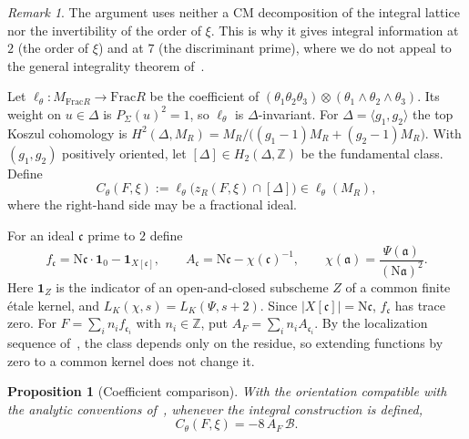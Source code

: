 \documentclass[11pt]{amsart}
\newtheorem{proposition}[theorem]{Proposition}
\theoremstyle{remark}
\newtheorem{remark}[theorem]{Remark}
\theoremstyle{definition}
\newcommand{\Z}{\mathbb{Z}}
\newcommand{\Nm}{\mathrm{N}}
\newcommand{\Bn}{\mathcal{B}}
\begin{document}
\begin{remark}\label{rem:why}
The argument uses neither a CM decomposition of the integral lattice nor the invertibility of the order of $\xi$. This is why it gives integral information at $2$ (the order of $\xi$) and at $7$ (the discriminant prime), where we do not appeal to the general integrality theorem of~\cite{KS}. %
\end{remark}

Let $\ell_\theta\colon M_{\mathrm{Frac}R}\to\mathrm{Frac}R$ be the coefficient of $(\theta_1\theta_2\theta_3)\otimes(\theta_1\wedge\theta_2\wedge\theta_3)$. Its weight on $u\in\Delta$ is $P_\Sigma(u)^2=1$, so $\ell_\theta$ is $\Delta$-invariant. For $\Delta=\langle g_1,g_2\rangle$ the top Koszul cohomology is $H^2(\Delta,M_R)=M_R/\bigl((g_1-1)M_R+(g_2-1)M_R\bigr)$. With $(g_1,g_2)$ positively oriented, let $[\Delta]\in H_2(\Delta,\Z)$ be the fundamental class. Define
\begin{equation}\label{eq:Ctheta}
C_\theta(F,\xi):=\ell_\theta\bigl(z_R(F,\xi)\cap[\Delta]\bigr)\in\ell_\theta(M_R),
\end{equation}
where the right-hand side may be a fractional ideal.

For an ideal $\mathfrak c$ prime to $2$ define
\begin{equation}\label{eq:smooth}
f_{\mathfrak c}=\Nm\mathfrak c\cdot\mathbf 1_0-\mathbf 1_{X[\mathfrak c]},\qquad A_{\mathfrak c}=\Nm\mathfrak c-\chi(\mathfrak c)^{-1},\qquad \chi(\mathfrak a)=\frac{\Psi(\mathfrak a)}{(\Nm\mathfrak a)^2}.
\end{equation}
Here $\mathbf 1_Z$ is the indicator of an open-and-closed subscheme $Z$ of a common finite \'etale kernel, and $L_K(\chi,s)=L_K(\Psi,s+2)$. Since $|X[\mathfrak c]|=\Nm\mathfrak c$, $f_{\mathfrak c}$ has trace zero. For $F=\sum_i n_if_{\mathfrak c_i}$ with $n_i\in\Z$, put $A_F=\sum_in_iA_{\mathfrak c_i}$. By the localization sequence of~\cite[\S2.3]{KS}, the class depends only on the residue, so extending functions by zero to a common kernel does not change it.

\begin{proposition}[Coefficient comparison]\label{prop:compare}
With the orientation compatible with the analytic conventions of~\cite{KS}, whenever the integral construction is defined,
\begin{equation}\label{eq:compare}
C_\theta(F,\xi)=-8\,A_F\,\Bn.
\end{equation}
\end{proposition}
\end{document}
